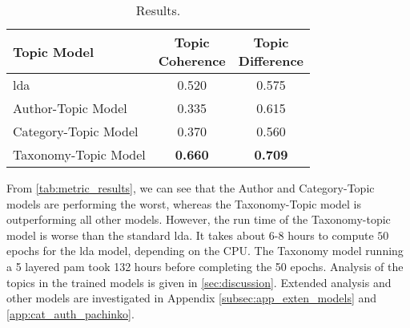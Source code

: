 \begin{table}[h]
	\centering
	\caption{Results.}
	\begin{tabular}{l|c|c}
		Topic Model & \makecell{Topic \\ Coherence} & \makecell{Topic \\ Difference} \\
		\midrule
		\Acrlong{lda} & 0.520 & 0.575 \\
		Author-Topic Model & 0.335 & 0.615 \\
		Category-Topic Model & 0.370 & 0.560 \\
		Taxonomy-Topic Model & \textbf{0.660} & \textbf{0.709} \\
	\end{tabular}
	\label{tab:metric_results}
\end{table}

From \autoref{tab:metric_results}, we can see that the Author and Category-Topic models are performing the worst, whereas the Taxonomy-Topic model is outperforming all other models.
However, the run time of the Taxonomy-topic model is worse than the standard \gls{lda}.
It takes about $6$-$8$ hours to compute $50$ epochs for the \gls{lda} model, depending on the CPU. 
The Taxonomy model running a 5 layered \gls{pam} took 132 hours before completing the 50 epochs.
Analysis of the topics in the trained models is given in \autoref{sec:discussion}.
Extended analysis and other models are investigated in Appendix \autoref{subsec:app_exten_models} and \autoref{app:cat_auth_pachinko}.
